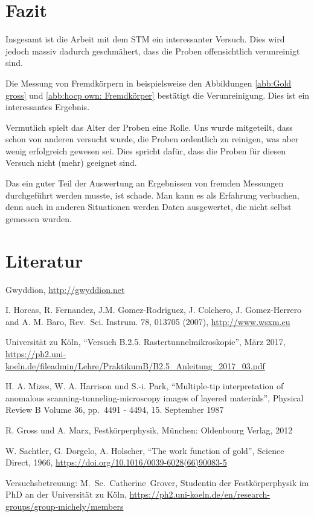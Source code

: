 \documentclass[12pt,a4paper]{scrartcl}
\numberwithin{equation}{section} %
\begin{document}
\clearpage
\hypertarget{fazit}{%
\section{Fazit}\label{fazit}}
Insgesamt ist die Arbeit mit dem STM ein interessanter Versuch. Dies wird jedoch massiv dadurch geschmähert, dass die Proben offensichtlich verunreinigt sind.

Die Messung von Fremdkörpern in beispielsweise den Abbildungen \ref{abb:Gold gross} und \ref{abb:hocp own: Fremdkörper} bestätigt die Verunreinigung. Dies ist ein interessantes Ergebnis.

Vermutlich spielt das Alter der Proben eine Rolle. Uns wurde mitgeteilt, dass schon von anderen versucht wurde, die Proben ordentlich zu reinigen, was aber wenig erfolgreich gewesen sei. Dies spricht dafür, dass die Proben für diesen Versuch nicht (mehr) geeignet sind.

Das ein guter Teil der Auswertung an Ergebnissen von fremden Messungen durchgeführt werden musste, ist schade. Man kann es als Erfahrung verbuchen, denn auch in anderen Situationen werden Daten ausgewertet, die nicht selbst gemessen wurden.


\clearpage
\hypertarget{literatur}{%
\section{Literatur}\label{literatur}}
\begin{thebibliography}{9}
	Gwyddion, \url{http://gwyddion.net}

	I. Horcas, R. Fernandez, J.M. Gomez-Rodriguez, J. Colchero, J. Gomez-Herrero and A. M. Baro, Rev.~Sci. Instrum. 78, 013705 (2007), \url{http://www.wsxm.eu}

	Universität zu Köln, ``Versuch B.2.5. Rastertunnelmikroskopie'', März 2017, 	\url{https://ph2.uni-koeln.de/fileadmin/Lehre/PraktikumB/B2.5_Anleitung_2017_03.pdf}

	H. A. Mizes, W. A. Harrison und S.-i. Park, ``Multiple-tip interpretation of anomalous scanning-tunneling-microscopy images of layered materials'', Physical Review B Volume 36, pp.~4491 - 4494, 15. September 1987

	R. Gross und A. Marx, Festkörperphysik, München: Oldenbourg Verlag, 2012

	W. Sachtler, G. Dorgelo, A. Holscher, ``The work function of gold'', Science Direct, 1966,
	\url{https://doi.org/10.1016/0039-6028(66)90083-5}

	Versuchsbetreuung: M.~Sc.~Catherine~Grover, Studentin der Festkörperphysik im PhD an der Universität zu Köln, \url{https://ph2.uni-koeln.de/en/research-groups/group-michely/members}
\end{thebibliography}
\end{document}
